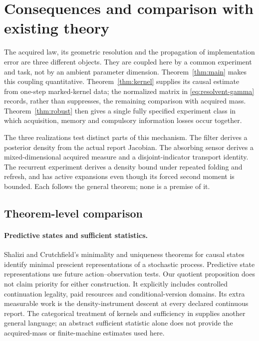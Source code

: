 \section{Consequences and comparison with existing theory}\label{sec:scope}
The acquired law, its geometric resolution and the propagation of implementation error are three different objects. They are coupled here by a common experiment and task, not by an ambient parameter dimension. Theorem~\ref{thm:main} makes this coupling quantitative. Theorem~\ref{thm:kernel} supplies its causal estimate from one-step marked-kernel data; the normalized matrix in \eqref{eq:resolvent-gamma} records, rather than suppresses, the remaining comparison with acquired mass. Theorem~\ref{thm:robust} then gives a single fully specified experiment class in which acquisition, memory and compulsory information losses occur together.

The three realizations test distinct parts of this mechanism. The filter derives a posterior density from the actual report Jacobian. The absorbing sensor derives a mixed-dimensional acquired measure and a disjoint-indicator transport identity. The recurrent experiment derives a density bound under repeated folding and refresh, and has active expansions even though its forced second moment is bounded. Each follows the general theorem; none is a premise of it.

\subsection{Theorem-level comparison}
\paragraph{Predictive states and sufficient statistics.}
Shalizi and Crutchfield's minimality and uniqueness theorems for causal states \cite[Theorems 2--3]{shalizi} identify minimal prescient representations of a stochastic process. Predictive state representations \cite{psr} use future action--observation tests. Our quotient proposition does not claim priority for either construction. It explicitly includes controlled continuation legality, paid resources and conditional-version domains. Its extra measurable work is the density-instrument descent at every declared continuous report. The categorical treatment of kernels and sufficiency in \cite{fritz} supplies another general language; an abstract sufficient statistic alone does not provide the acquired-mass or finite-machine estimates used here.

